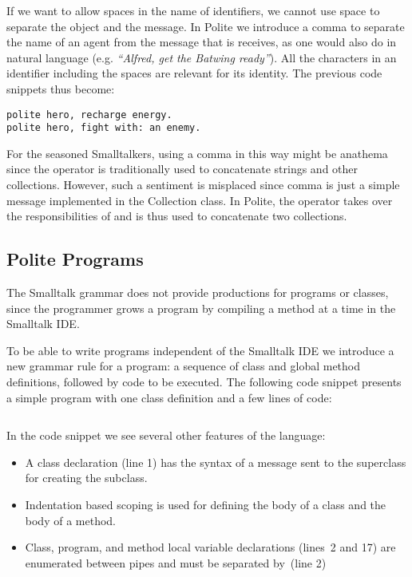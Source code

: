 If we want to allow spaces in the name of identifiers, we cannot use space to separate the object and the message. 
In Polite we introduce a comma to separate the name of an agent from the message that is receives, as one would also do in natural language (e.g. {\em ``Alfred, get the Batwing ready''}). All the characters in an identifier including the spaces are relevant for its identity. The previous code snippets thus become: 

\begin{verbatim} 
polite hero, recharge energy. 
polite hero, fight with: an enemy.
\end{verbatim}

For the seasoned Smalltalkers, using a comma in this way might be anathema since the operator is traditionally used to concatenate strings and other collections. However, such a sentiment is misplaced since comma is just a simple message implemented in the Collection class. In Polite, the \plus operator takes over the responsibilities of \comma and is thus used to concatenate two collections.


\subsection{Polite Programs}
The Smalltalk grammar does not provide productions for programs or classes, since the programmer grows a program by compiling a method at a time in the Smalltalk IDE. 

To be able to write programs independent of the Smalltalk IDE we introduce a new grammar rule for a program: a sequence of class and global method definitions, followed by code to be executed. The following code snippet presents a simple program with one class definition and a few lines of code: 
\vspace{0.5em}

\inputminted[bgcolor=lbcolor,linenos]{text}{polite-hero.polite}

\vspace{0.5em}
In the code snippet we see several other features of the language: 

\begin{itemize}

	\item A class declaration (line 1) has the syntax of a message sent to the superclass for creating the subclass. 

	\item Indentation based scoping is used for defining the body of a class and the body of a method. 

	\item Class, program, and method local variable declarations (lines~2 and 17) are enumerated between pipes and must be separated by~\comma (line 2)

\end{itemize}


